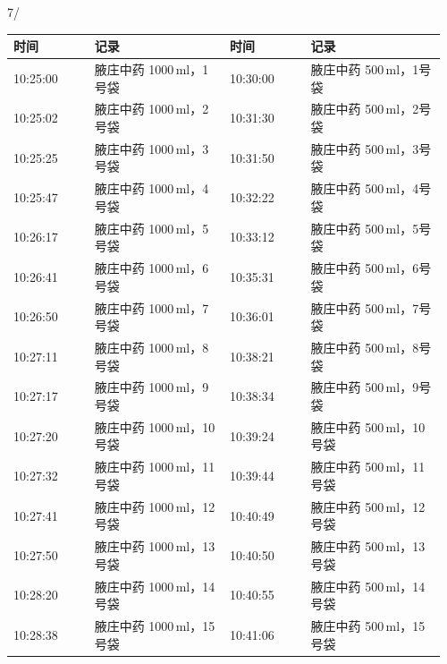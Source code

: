 \documentclass[UTF8,10pt,a4paper,fontset=fandol]{ctexart}
\newcommand{\handwritten}[1]{#1}
\begin{document}
\begin{center}
{\begin{minipage}{0.96\textheight}
\vspace{1em}

\end{minipage}%
}
\end{center}

\handwritten{7/}

\newpage

\begin{center}
\small
\begin{tabular}{p{0.18\linewidth}p{0.30\linewidth}p{0.18\linewidth}p{0.30\linewidth}}
\textbf{时间} & \textbf{记录} & \textbf{时间} & \textbf{记录} \\ \hline
10:25:00 & 腋庄中药 1000\,ml，1号袋 & 10:30:00 & 腋庄中药 500\,ml，1号袋 \\
10:25:02 & 腋庄中药 1000\,ml，2号袋 & 10:31:30 & 腋庄中药 500\,ml，2号袋 \\
10:25:25 & 腋庄中药 1000\,ml，3号袋 & 10:31:50 & 腋庄中药 500\,ml，3号袋 \\
10:25:47 & 腋庄中药 1000\,ml，4号袋 & 10:32:22 & 腋庄中药 500\,ml，4号袋 \\
10:26:17 & 腋庄中药 1000\,ml，5号袋 & 10:33:12 & 腋庄中药 500\,ml，5号袋 \\
10:26:41 & 腋庄中药 1000\,ml，6号袋 & 10:35:31 & 腋庄中药 500\,ml，6号袋 \\
10:26:50 & 腋庄中药 1000\,ml，7号袋 & 10:36:01 & 腋庄中药 500\,ml，7号袋 \\
10:27:11 & 腋庄中药 1000\,ml，8号袋 & 10:38:21 & 腋庄中药 500\,ml，8号袋 \\
10:27:17 & 腋庄中药 1000\,ml，9号袋 & 10:38:34 & 腋庄中药 500\,ml，9号袋 \\
10:27:20 & 腋庄中药 1000\,ml，10号袋 & 10:39:24 & 腋庄中药 500\,ml，10号袋 \\
10:27:32 & 腋庄中药 1000\,ml，11号袋 & 10:39:44 & 腋庄中药 500\,ml，11号袋 \\
10:27:41 & 腋庄中药 1000\,ml，12号袋 & 10:40:49 & 腋庄中药 500\,ml，12号袋 \\
10:27:50 & 腋庄中药 1000\,ml，13号袋 & 10:40:50 & 腋庄中药 500\,ml，13号袋 \\
10:28:20 & 腋庄中药 1000\,ml，14号袋 & 10:40:55 & 腋庄中药 500\,ml，14号袋 \\
10:28:38 & 腋庄中药 1000\,ml，15号袋 & 10:41:06 & 腋庄中药 500\,ml，15号袋 \\

\end{tabular}
\end{center}
\end{document}
